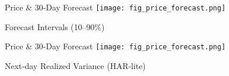 \documentclass[11pt]{beamer}
\begin{document}
\begin{frame}{Price \& 30-Day Forecast}
  \centering
  \texttt{[image: fig\_price\_forecast.png]}
\end{frame}

\begin{frame}[plain]{Forecast Intervals (10--90\%)}
  \centering
\end{frame}

\begin{frame}{Price \& 30-Day Forecast}
  \centering
  \texttt{[image: fig\_price\_forecast.png]}
\end{frame}

\begin{frame}[plain]{Next‑day Realized Variance (HAR‑lite)}
  \centering
\end{frame}
\end{document}

